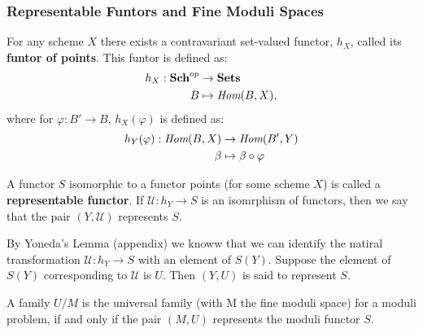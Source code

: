 \subsubsection{Representable Funtors and Fine Moduli Spaces}
\begin{definition}
    For any scheme $X$ there exists a contravariant set-valued functor, $h_{X}$, called its \textbf{funtor of points}.
    This funtor is defined as: 
    \begin{align*}
        h_{X}: \textbf{Sch}^{op} &\to \textbf{Sets}\\
        B &\mapsto \emph{Hom}(B,X),
    \end{align*}
    where for $\varphi:B' \to B$, $h_{X}(\varphi)$ is defined as:
    \begin{align*}
        h_Y(\varphi):\emph{Hom}(B,X) &\to \emph{Hom}(B',Y)\\
        \beta &\mapsto \beta \circ \varphi
    \end{align*}
\end{definition}
\begin{definition}
    A functor $S$ isomorphic to a functor points (for some scheme $X$) is called a \textbf{representable functor}.
    If $\mathcal{U}:h_{Y}\to S$ is an isomrphism of functors, then we say that the pair $(Y, \mathcal{U})$ represents $S$.
\end{definition}
By Yoneda's Lemma (appendix) we knoww that we can identify the natiral transformation $\mathcal{U}:h_{Y}\to S$ with an element of $S(Y)$.
Suppose the element of $S(Y)$ corresponding to $\mathcal{U}$ is $U$.
Then $(Y,U)$ is said to represent $S$.
\begin{proposition}
    A family $U/M$ is the universal family (with M the fine moduli space) for a moduli problem, if and only if the pair $(M,U)$ represents the moduli functor $S$.
\end{proposition}
